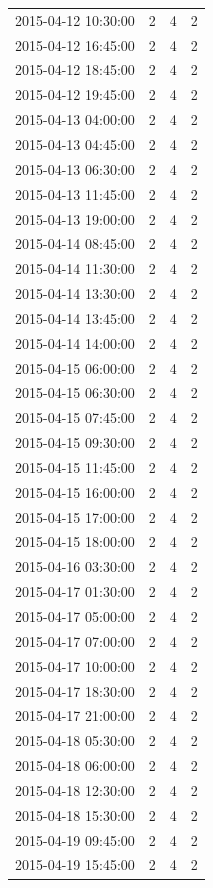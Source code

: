 \begin{tabular}{lrrr}
2015-04-12 10:30:00 & 2 & 4 & 2 \\
2015-04-12 16:45:00 & 2 & 4 & 2 \\
2015-04-12 18:45:00 & 2 & 4 & 2 \\
2015-04-12 19:45:00 & 2 & 4 & 2 \\
2015-04-13 04:00:00 & 2 & 4 & 2 \\
2015-04-13 04:45:00 & 2 & 4 & 2 \\
2015-04-13 06:30:00 & 2 & 4 & 2 \\
2015-04-13 11:45:00 & 2 & 4 & 2 \\
2015-04-13 19:00:00 & 2 & 4 & 2 \\
2015-04-14 08:45:00 & 2 & 4 & 2 \\
2015-04-14 11:30:00 & 2 & 4 & 2 \\
2015-04-14 13:30:00 & 2 & 4 & 2 \\
2015-04-14 13:45:00 & 2 & 4 & 2 \\
2015-04-14 14:00:00 & 2 & 4 & 2 \\
2015-04-15 06:00:00 & 2 & 4 & 2 \\
2015-04-15 06:30:00 & 2 & 4 & 2 \\
2015-04-15 07:45:00 & 2 & 4 & 2 \\
2015-04-15 09:30:00 & 2 & 4 & 2 \\
2015-04-15 11:45:00 & 2 & 4 & 2 \\
2015-04-15 16:00:00 & 2 & 4 & 2 \\
2015-04-15 17:00:00 & 2 & 4 & 2 \\
2015-04-15 18:00:00 & 2 & 4 & 2 \\
2015-04-16 03:30:00 & 2 & 4 & 2 \\
2015-04-17 01:30:00 & 2 & 4 & 2 \\
2015-04-17 05:00:00 & 2 & 4 & 2 \\
2015-04-17 07:00:00 & 2 & 4 & 2 \\
2015-04-17 10:00:00 & 2 & 4 & 2 \\
2015-04-17 18:30:00 & 2 & 4 & 2 \\
2015-04-17 21:00:00 & 2 & 4 & 2 \\
2015-04-18 05:30:00 & 2 & 4 & 2 \\
2015-04-18 06:00:00 & 2 & 4 & 2 \\
2015-04-18 12:30:00 & 2 & 4 & 2 \\
2015-04-18 15:30:00 & 2 & 4 & 2 \\
2015-04-19 09:45:00 & 2 & 4 & 2 \\
2015-04-19 15:45:00 & 2 & 4 & 2 \\

\end{tabular}

